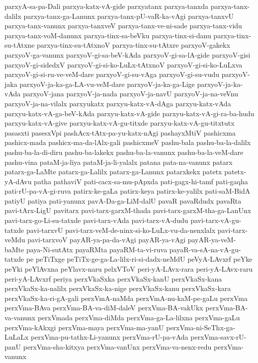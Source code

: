 {parxyA-sa-pa-Dali
parxya-katx-vA-gide
parxyatanx
parxya-tanxda
parxya-tanx-dalilx
parxya-tanx-ga-Lanunx
parxya-tanx-pU-vaR-ka-vAgi
parxya-tanxvU
parxya-tanx-vanunx
parxya-tanxveV
parxya-tanx-ve-ni-sade
parxya-tanx-vidu
parxya-tanx-voM-danunx
parxya-tinx-sa-beVku
parxya-tinx-si-danu
parxya-tinx-su-tAtxne
parxya-tinx-su-tAtxnoV
parxya-tinx-su-tAtxre
parxyoV-gakekx
parxyoV-ga-vanunx
parxyoV-gi-sa-beV-kAda
parxyoV-gi-sa-lA-gide
parxyoV-gisi
parxyoV-gi-sidedxV
parxyoV-gi-si-ko-LuLx-tAtxnoV
parxyoV-gi-si-ko-LuLxva
parxyoV-gi-si-ru-ve-veM-dare
parxyoV-gi-su-vAga
parxyoV-gi-su-vudu
parxyoV-jaka
parxyoV-ja-ka-ga-LA-vu-veM-dare
parxyoV-ja-ka-ga-Lige
parxyoV-ja-ka-vAda
parxyoV-jana
parxyoV-ja-nada
parxyoV-ja-navU
parxyoV-ja-na-veVnu
parxyoV-ja-na-vilalx
parxyukatx
parxyu-katx-vA-dAga
parxyu-katx-vAda
parxyu-katx-vA-ga-beV-kAda
parxyu-katx-vA-gide
parxyu-katx-vA-gi-ra-ba-hudu
parxyu-katx-vA-give
parxyu-katx-vA-gu-titxde
parxyu-katx-vA-gu-titxtutx
pasasxti
pasesxVpi
pashAcx-tAtx-pa-yu-katx-nAgi
pashayxMtiV
pashicxma
pashicx-mada
pashicx-ma-da-lAlx-gali
pashicxmeV
pashu-bala
pashu-ba-la-dalilx
pashu-ba-la-di-diru
pashu-ba-lakekx
pashu-ba-la-vanunx
pashu-ba-la-veM-dare
pashu-vina
pataM-ja-liya
pataM-ja-li-yalalx
patana
pata-na-vanunx
patarx
patarx-ga-LaMte
patarx-ga-Lalilx
patarx-ga-Lanunx
patarxkekx
patetx
patetx-yA-dAvu
patha
pathaviV
pati-cacx-sa-mu-pApxda
pati-gagx-hi-tamf
pati-gaqha
pati-rU-pa-vA-gi-ruva
patirx-ke-gaLa
patirx-keya
patirx-ke-yalilx
pati-saM-BidA
patiyU
patiya
pati-yanunx
pavA-Da-ga-LiM-dalU
pavaR
pavaRdudx
pavaRta
pavi-tArx-LigU
pavitarx
pavi-tarx-garxM-thada
pavi-tarx-garxM-tha-ga-LanUnx
pavi-tarx-go-Li-su-tatxde
pavi-tarx-vAda
pavi-tarx-vA-dudu
pavi-tarx-vA-gu-tatxde
pavi-tarxvU
pavi-tarx-veM-de-ninx-si-ko-LuLx-vu-da-nenxlalx
pavi-tarx-veMdu
pavi-tarxvoV
payAR-ya-pa-da-vAgi
payAR-ya-vAgi
payAR-ya-veM-baMte
paya-Ni-sutAtx
payaRMta
payaRM-ta-vi-ruva
payaR-va-sA-na-vA-gu-tatxde
pe
peTiTxge
peTiTx-ge-ga-La-lilx-ri-si-dadx-neMdU
peVyA-LAvxrf
peYke
peYki
peYlAvxna
peYlavx-naru
pelxVToV
peri-yA-LAvx-rara
peri-yA-LAvx-raru
peri-yA-LAvxrf
periya
perxVkaSxka
perxVkaSx-kanU
perxVkaSx-kana
perxVkaSx-ka-nalilx
perxVkaSx-ka-nige
perxVkaSx-kanu
perxVkaSx-kara
perxVkaSx-ka-ri-gA-gali
perxVmA-naMda
perxVmA-nu-kaM-pe-gaLu
perxVma
perxVma-BAva
perxVma-BA-va-diM-daleV
perxVma-BA-vakUkx
perxVma-BA-va-vanunx
perxVmada
perxVma-diMda
perxVma-ga-La-lilxna
perxVma-gaLu
perxVma-kAkxgi
perxVma-maya
perxVma-ma-yanU
perxVma-ni-SeThx-ga-LuLaLx
perxVma-pu-tathx-Li-yanunx
perxVma-rU-pa-vAda
perxVma-savx-rU-panU
perxVma-sha-kitxya
perxVma-vanUnx
perxVma-va-nenx-redu
perxVma-vanunx
}
